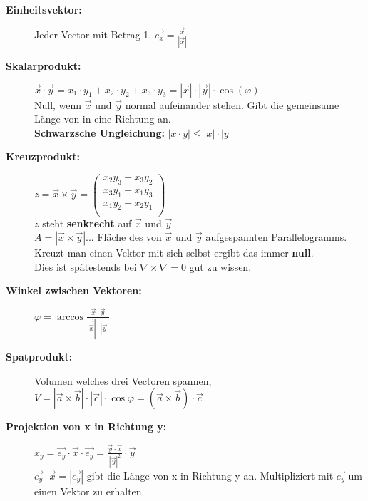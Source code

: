 \begin{description}
    \item [\textbf{Einheitsvektor:}] Jeder Vector mit Betrag 1. $\vec{e_x}=\frac{\vec{x}}{|\vec{x}|}$\\

    \item[\textbf{Skalarprodukt:}] $\vec x \cdot \vec{y} = x_1\cdot y_1 + x_2\cdot y_2 + x_3\cdot y_3 = |\vec{x}|\cdot|\vec{y}|\cdot \cos(\varphi)$\\
    Null, wenn $\vec x $ und $\vec y $ normal aufeinander stehen. Gibt die gemeinsame Länge von in eine  Richtung an.\\
    \textbf{Schwarzsche Ungleichung:} $|x\cdot y|\leq |x|\cdot |y|$\\
    
    \item[\textbf{Kreuzprodukt:}] $z = \vec x \times \vec y  = 
    \begin{pmatrix}
        x_2y_3-x_3y_2\\
        x_3y_1-x_1y_3\\
        x_1y_2-x_2y_1\\
    \end{pmatrix}$\\
    
    $z$ steht \textbf{senkrecht} auf $\vec x $ und $\vec y $\\
    $A = |\vec x \times \vec y |$... Fläche des von $\vec x $ und $\vec y $ aufgespannten Parallelogramms.\\
    Kreuzt man einen Vektor mit sich selbst ergibt das immer \textbf{null}.\\
    Dies ist spätestends bei $\nabla \times \nabla = 0$ gut zu wissen.\\

    \item[\textbf{Winkel zwischen Vektoren:}]  $\varphi = \arccos \frac{\vec x \cdot \vec y }{|\vec{\vec x }|\cdot |\vec y |}$\\
    
    \item[\textbf{Spatprodukt:} ] Volumen welches drei Vectoren spannen, $V = |\vec a \times \vec b |\cdot |\vec c | \cdot \cos \varphi = (\vec a \times \vec b )\cdot \vec c $\\
    
    \item[\textbf{Projektion von x in Richtung y:}] $x_y=\vec{e_y}\cdot \vec{x} \cdot \vec{e_y}=\frac{\vec{y}\cdot \vec{x}}{|\vec{y}|^2} \cdot \vec{y}$\\
    $\vec{e_y}\cdot \vec{x} = |\vec{e_y}|$ gibt die Länge von x in Richtung y an. Multipliziert mit $\vec{e_y}$ um einen Vektor zu erhalten.
    

\end{description}
 